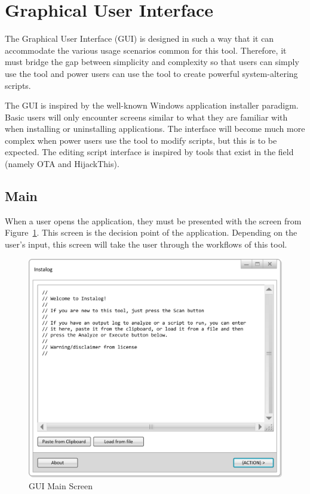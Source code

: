 \section{Graphical User Interface}
The Graphical User Interface (GUI) is designed in such a way that it can
accommodate the various usage scenarios common for this tool.  Therefore, it
must bridge the gap between simplicity and complexity so that users can simply
use the tool and power users can use the tool to create powerful system-altering
scripts.

The GUI is inspired by the well-known Windows application installer paradigm. 
Basic users will only encounter screens similar to what they are familiar with
when installing or uninstalling applications.  The interface will become much
more complex when power users use the tool to modify scripts, but this is to be
expected.  The editing script interface is inspired by tools that exist in the
field (namely OTA and HijackThis).

\subsection{Main}
When a user opens the application, they must be presented with the screen from
Figure~\ref{fig:gui_main}.  This screen is the decision point of the
application.  Depending on the user's input, this screen will take the user
through the workflows of this tool.

\begin{figure}[h]
  	\centering
	\includegraphics{figures/gui/Main.png}
  	\caption{GUI Main Screen}
  	\label{fig:gui_main}
\end{figure}

